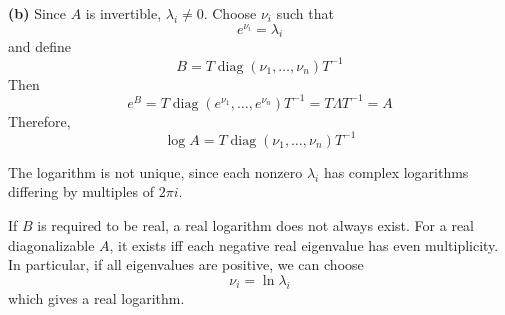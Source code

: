 
\textbf{(b)}
Since \(A\) is invertible, \(\lambda_i\neq 0\). Choose \(\nu_i\) such that
\[
e^{\nu_i}=\lambda_i
\]
and define
\[
B=T\operatorname{diag}(\nu_1,\ldots,\nu_n)T^{-1}
\]
Then
\[
e^B
=
T\operatorname{diag}(e^{\nu_1},\ldots,e^{\nu_n})T^{-1}
=
T\Lambda T^{-1}
=
A
\]
Therefore,
\[
\boxed{\log A
=
T\operatorname{diag}(\nu_1,\ldots,\nu_n)T^{-1}}
\]

The logarithm is not unique, since each nonzero \(\lambda_i\) has complex
logarithms differing by multiples of \(2\pi i\).

If \(B\) is required to be real, a real logarithm does not always exist.
For a real diagonalizable \(A\), it exists iff each negative real eigenvalue
has even multiplicity. In particular, if all eigenvalues are positive, we can
choose
\[
\nu_i=\ln \lambda_i
\]
which gives a real logarithm.
